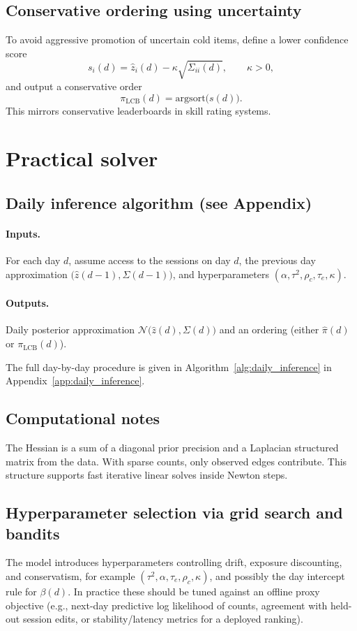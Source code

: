 \documentclass[11pt]{article}
\begin{document}
\subsection{Conservative ordering using uncertainty}
To avoid aggressive promotion of uncertain cold items, define a lower confidence score
\[
s_i(d)=\widehat z_i(d)-\kappa\sqrt{\Sigma_{ii}(d)},
\qquad \kappa>0,
\]
and output a conservative order
\[
\pi_{\mathrm{LCB}}(d)=\mathrm{argsort}\big(s(d)\big).
\]
This mirrors conservative leaderboards in skill rating systems.

\section{Practical solver}

\subsection{Daily inference algorithm (see Appendix)}
\paragraph{Inputs.}
For each day $d$, assume access to the sessions on day $d$, the previous day approximation
$\big(\widehat z(d-1),\Sigma(d-1)\big)$, and hyperparameters $(\alpha,\tau^2,\rho_c,\tau_e,\kappa)$.

\paragraph{Outputs.}
Daily posterior approximation $\mathcal N\!\big(\widehat z(d),\Sigma(d)\big)$ and an ordering (either $\widehat\pi(d)$ or $\pi_{\mathrm{LCB}}(d)$).

The full day-by-day procedure is given in Algorithm~\ref{alg:daily_inference} in Appendix~\ref{app:daily_inference}.

\subsection{Computational notes}
The Hessian is a sum of a diagonal prior precision and a Laplacian structured matrix from the data.
With sparse counts, only observed edges contribute.
This structure supports fast iterative linear solves inside Newton steps.

\subsection{Hyperparameter selection via grid search and bandits}
The model introduces hyperparameters controlling drift, exposure discounting, and conservatism, for example
$(\tau^2,\alpha,\tau_e,\rho_c,\kappa)$, and possibly the day intercept rule for $\beta(d)$.
In practice these should be tuned against an offline proxy objective (e.g., next-day predictive log likelihood of counts,
agreement with held-out session edits, or stability/latency metrics for a deployed ranking).
\end{document}
